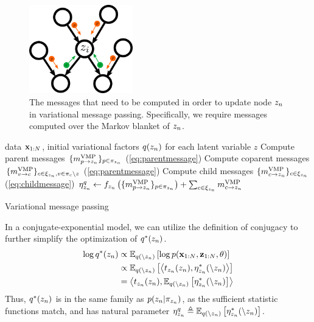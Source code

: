 \begin{figure}[htp!]
    \centering
    \includegraphics[width=0.4\textwidth]{img/nvmp/vmp-4}
    \caption{The messages that need to be computed in order to update
    node $z_n$ in variational message passing. Specifically, we require
    messages computed over the Markov blanket of $z_n$.}
    \label{fig:vmp}
\end{figure}
\begin{algorithm}[htp!]
\begin{algorithmic}
    data $\mathbf{x}_{1:N}$, initial variational factors $q(z_n)$ for each latent variable $z$
   \REPEAT
   \STATE Compute parent messages $\{m^{\text{VMP}}_{p \rightarrow z_n}\}_{p \in \pi_{z_n}}$ (\autoref{eq:parentmessage})
   \STATE Compute coparent messages $\{m^{\text{VMP}}_{v \rightarrow c}\}_{c \in \xi_{z_n}, v \in \pi_c \backslash z}$ (\autoref{eq:parentmessage})
   \STATE Compute child messages $\{m^{\text{VMP}}_{c \rightarrow z_n}\}_{c \in \xi_{z_n}}$
   (\autoref{eq:childmessage})
   \STATE $\eta^q_{z_n} \leftarrow f_{z_n}\left(\{m^{\text{VMP}}_{p \rightarrow z_n}\}_{p \in \pi_{z_n}}\right) + \sum_{c \in \xi_{z_n}} m^{\text{VMP}}_{c \rightarrow z_n}$ 
   \ENDFOR
\end{algorithmic}
   \caption{Variational message passing}
   \label{alg:vmp}
\end{algorithm}


In a conjugate-exponential model, we can utilize the definition
of conjugacy to further simplify the optimization of $q^*(z_n)$.
\begin{equation}
\begin{split}
    \log q^*(z_n) &\propto \mathbb{E}_{q(\backslash z_n)} \left[
    \log p(\mathbf{x}_{1:N}, \mathbf{z}_{1:N}, \theta)\right]\\
    &\propto \mathbb{E}_{q(\backslash z_n)} \left[
    \left\langle t_{z_n}(z_n), \eta^*_{z_n}(\backslash z_n)\right\rangle\right]\\
    &= 
    \left\langle t_{z_n}(z_n), \mathbb{E}_{q(\backslash z_n)}\left[\eta^*_{z_n}(\backslash z_n)\right]\right\rangle
\end{split}
\end{equation}
Thus, $q^*(z_n)$ 
is in the same family as $p(z_n | \pi_{z_n})$,
as the sufficient statistic functions match,
and has natural parameter $\eta^q_{z_n} \triangleq \mathbb{E}_{q(\backslash z_n)}\left[\eta^*_{z_n}(\backslash z_n)\right]$.

